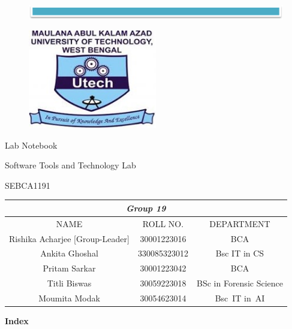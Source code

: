 \documentclass{article}
\begin{document}
\begin{figure}[h]
    \includegraphics[width=1\textwidth]{Line.png}
\end{figure}

\begin{figure}[h]
\begin{center}
    \includegraphics[width=0.5\textwidth]{MAKAUT_LOGO}
\end{center}
\end{figure}
\vspace{1cm}
\begin{center}
     {\Huge Lab Notebook}
\end{center}
\begin{center}
    {\Large
    Software Tools and Technology Lab}
\end{center}
\begin{center}
        {\Large SEBCA1191}
\end{center}
\vspace{1cm}
\renewcommand{\arraystretch}{2}
\begin{center}
\begin{tabular}{ |c|c|c| }
\hline
\multicolumn{3}{|c|}{\Large \textbf{\textit{Group 19}}} \\
\hline
NAME & ROLL NO.& DEPARTMENT \\
\hline
Rishika Acharjee [Group-Leader]  & 30001223016 & BCA \\
\hline
Ankita Ghoshal & 330085323012 & Bsc IT in CS \\
\hline
Pritam Sarkar  & 30001223042 & BCA \\
\hline
Titli Biswas & 30059223018 & BSc in Forensic Science \\
\hline
Moumita Modak & 30054623014 & Bsc IT in AI \\
\hline
\end{tabular}
\end{center}
\newpage
\begin{center}
    \Huge\textbf{Index}
\end{center}
\end{document}

